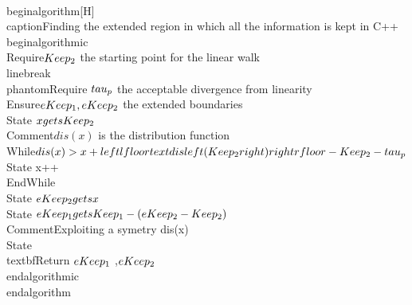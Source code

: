 \\begin{algorithm}[H]
 \\caption{Finding the extended region in which all the information is kept in C++}
\\begin{algorithmic}
 \\Require{$\\Keep _2$ the starting point for the linear walk } 
 \\linebreak \\phantom{Require} $\\tau_{p}$ the acceptable divergence from linearity 
 \\Ensure{$ \\{\\eKeep_1, \\eKeep_2\\} $ the extended boundaries}
 \\State $x \\gets \\Keep_2$  \\Comment{$dis(x)$ is the distribution function}
 \\While{$dis(x) > x + \\left\\lfloor\\text{dis}\\left(\\Keep _2\\right)\\right\\rfloor  -\\Keep _2 - \\tau_{p}$}
     \\State  x++ 
 \\EndWhile
 \\State $\\eKeep_2 \\gets x$ 
 \\State $\\eKeep_1 \\gets \\Keep _1 - (\\eKeep_2 - \\Keep _2)$ \\Comment{Exploiting a symetry dis(x)}
 \\State \\textbf{Return} {$\\eKeep_1$ ,$\\eKeep_2$ }
 \\end{algorithmic}
\\end{algorithm}

